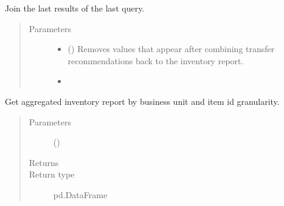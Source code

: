 \documentclass[letterpaper,10pt,english]{sphinxmanual}
\begin{document}

\begin{fulllineitems}
\label{\detokenize{source/optimization.datatools:optimization.datatools.dataprep.fix_last_results_join}}
Join the last results of the last query.
\begin{quote}\begin{description}
\item[{Parameters}] \leavevmode\begin{itemize}
\item {} 
 () \textendash{} Removes  values that appear after combining transfer recommendations back to the inventory report.

\item {} 
 \textendash{} 

\end{itemize}

\end{description}\end{quote}

\end{fulllineitems}


\begin{fulllineitems}
\label{\detokenize{source/optimization.datatools:optimization.datatools.dataprep.get_bu_granularity}}
Get aggregated inventory report by business unit and item id granularity.
\begin{quote}\begin{description}
\item[{Parameters}] \leavevmode
{} () \textendash{} 

\item[{Returns}] \leavevmode
{}

\item[{Return type}] \leavevmode
pd.DataFrame

\end{description}\end{quote}

\end{fulllineitems}
\end{document}
